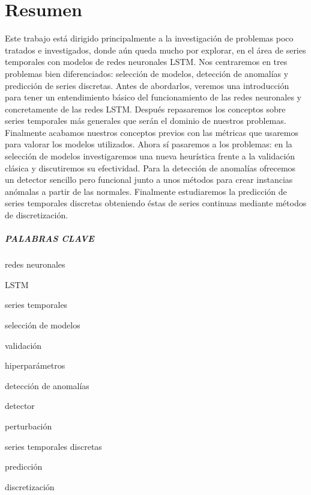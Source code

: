 %


\chapter*{Resumen}\label{ch:resumen}

Este trabajo está dirigido principalmente a la investigación de problemas poco tratados e investigados, donde aún queda mucho por explorar, en el área de series temporales con modelos de redes neuronales LSTM. Nos centraremos en tres problemas bien diferenciados: selección de modelos, detección de anomalías y predicción de series discretas. Antes de abordarlos, veremos una introducción para tener un entendimiento básico del funcionamiento de las redes neuronales y concretamente de las redes LSTM. Después repasaremos los conceptos sobre series temporales más generales que serán el dominio de nuestros problemas. Finalmente acabamos nuestros conceptos previos con las métricas que usaremos para valorar los modelos utilizados. Ahora sí pasaremos a los problemas: en la selección de modelos investigaremos una nueva heurística frente a la validación clásica y discutiremos su efectividad. Para la detección de anomalías ofrecemos un detector sencillo pero funcional junto a unos métodos para crear instancias anómalas a partir de las normales. Finalmente estudiaremos la predicción de series temporales discretas obteniendo éstas de series continuas mediante métodos de discretización.

\paragraph{PALABRAS CLAVE}
\begin{itemize*}[label=,itemsep=4em,itemjoin=\hspace{2em}]
  \item redes neuronales
  \item LSTM
  \item series temporales
  \item selección de modelos
  \item validación
  \item hiperparámetros
  \item detección de anomalías
  \item detector
  \item perturbación
  \item series temporales discretas
  \item predicción
  \item discretización
\end{itemize*}

\endinput
